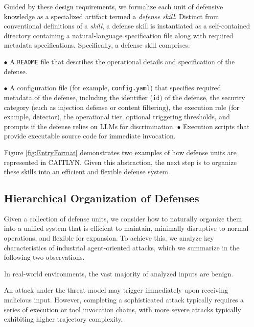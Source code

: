 Guided by these design requirements, we formalize each unit of
defensive knowledge as a specialized artifact termed a \textit{defense
  skill}. Distinct from conventional definitions of a \emph{skill}, a
defense skill is instantiated as a self-contained directory containing
a natural-language specification file along with required metadata
specifications. Specifically, a defense skill comprises:

\noindent $\bullet$
A \texttt{README} file that describes the operational details
  and specification of the defense.

\noindent $\bullet$
A configuration file (for example, \texttt{config.yaml}) that
  specifies required metadata of the defense, including the identifier
  (\texttt{id}) of the defense, the security category (such as
  injection defense or content filtering), the execution role (for
  example, detector), the operational tier, optional triggering
  thresholds, and prompts if the defense relies on LLMs for
  discrimination.
\noindent $\bullet$
Execution scripts that provide executable source code for
  immediate invocation.

Figure \ref{fig:EntryFormat} demonstrates two examples of how defense
units are represented in CAITLYN. Given this abstraction, the
next step is to organize these skills into an efficient and flexible
defense system.

\subsection{Hierarchical Organization of Defenses}
\label{sec:runtime}

Given a collection of defense units, we consider how to naturally
organize them into a unified system that is efficient to maintain,
minimally disruptive to normal operations, and flexible for
expansion. To achieve this, we analyze key characteristics of
industrial agent-oriented attacks, which we summarize in the following
two observations.

\begin{observation}
In real-world environments, the vast majority of analyzed inputs are benign.
\end{observation}

\begin{observation}
An attack under the threat model may trigger immediately upon
receiving malicious input. However, completing a sophisticated attack
typically requires a series of execution or tool invocation chains,
with more severe attacks typically exhibiting higher trajectory complexity.
\end{observation}


